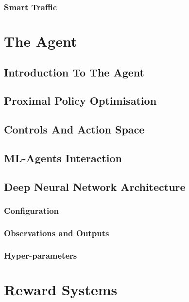 \documentclass{article}
\begin{document}
\subsubsection{Smart Traffic}
\lipsum[2][1]

\section{The Agent}
\lipsum[2][1]

\subsection{Introduction To The Agent}
\lipsum[2][1]

\subsection{Proximal Policy Optimisation}
\lipsum[2][1]

\subsection{Controls And Action Space}
\lipsum[2][1]

\subsection{ML-Agents Interaction}
\lipsum[2][1]

\subsection{Deep Neural Network Architecture}
\lipsum[2][1]

\subsubsection{Configuration}
\lipsum[2][1]

\subsubsection{Observations and Outputs}
\lipsum[2][1]

\subsubsection{Hyper-parameters}
\lipsum[2][1]

\section{Reward Systems}
\lipsum[2][1]
\end{document}
